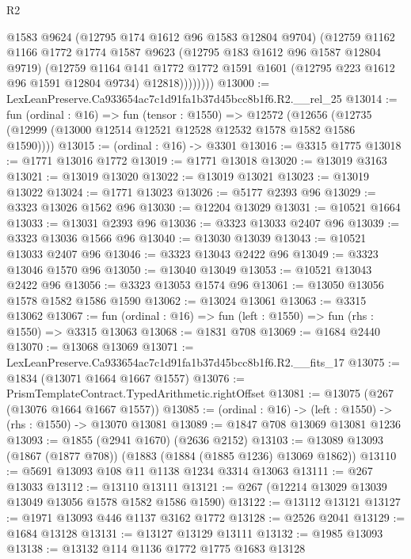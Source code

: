 \begin{lexlean}{R2}
\begin{coremodule}
                @1583
                @9624
                (@12795 @174 @1612 @96 @1583 @12804 @9704)
                (@12759
                  @1162
                  @1166
                  @1772
                  @1774
                  @1587
                  @9623
                  (@12795 @183 @1612 @96 @1587 @12804 @9719)
                  (@12759
                    @1164
                    @141
                    @1772
                    @1772
                    @1591
                    @1601
                    (@12795 @223 @1612 @96 @1591 @12804 @9734)
                    @12818))))))))
@13000 := LexLeanPreserve.Ca933654ac7c1d91fa1b37d45bcc8b1f6.R2.__rel_25
@13014 := fun (ordinal : @16) =>
  fun (tensor : @1550) =>
  @12572 (@12656 (@12735 (@12999 (@13000 @12514 @12521 @12528 @12532 @1578 @1582 @1586 @1590))))
@13015 := (ordinal : @16) -> @3301
@13016 := @3315 @1775
@13018 := @1771 @13016 @1772
@13019 := @1771 @13018
@13020 := @13019 @3163
@13021 := @13019 @13020
@13022 := @13019 @13021
@13023 := @13019 @13022
@13024 := @1771 @13023
@13026 := @5177 @2393 @96
@13029 := @3323 @13026 @1562 @96
@13030 := @12204 @13029
@13031 := @10521 @1664
@13033 := @13031 @2393 @96
@13036 := @3323 @13033 @2407 @96
@13039 := @3323 @13036 @1566 @96
@13040 := @13030 @13039
@13043 := @10521 @13033 @2407 @96
@13046 := @3323 @13043 @2422 @96
@13049 := @3323 @13046 @1570 @96
@13050 := @13040 @13049
@13053 := @10521 @13043 @2422 @96
@13056 := @3323 @13053 @1574 @96
@13061 := @13050 @13056 @1578 @1582 @1586 @1590
@13062 := @13024 @13061
@13063 := @3315 @13062
@13067 := fun (ordinal : @16) => fun (left : @1550) => fun (rhs : @1550) => @3315 @13063
@13068 := @1831 @708
@13069 := @1684 @2440
@13070 := @13068 @13069
@13071 := LexLeanPreserve.Ca933654ac7c1d91fa1b37d45bcc8b1f6.R2.__fits_17
@13075 := @1834 (@13071 @1664 @1667 @1557)
@13076 := PrismTemplateContract.TypedArithmetic.rightOffset
@13081 := @13075 (@267 (@13076 @1664 @1667 @1557))
@13085 := (ordinal : @16) -> (left : @1550) -> (rhs : @1550) -> @13070 @13081
@13089 := @1847 @708 @13069 @13081 @1236
@13093 := @1855 (@2941 @1670) (@2636 @2152)
@13103 := @13089 @13093 (@1867 (@1877 @708)) (@1883 (@1884 (@1885 @1236) @13069 @1862))
@13110 := @5691 @13093 @108 @11 @1138 @1234 @3314 @13063
@13111 := @267 @13033
@13112 := @13110 @13111
@13121 := @267 (@12214 @13029 @13039 @13049 @13056 @1578 @1582 @1586 @1590)
@13122 := @13112 @13121
@13127 := @1971 @13093 @446 @1137 @3162 @1772
@13128 := @2526 @2041
@13129 := @1684 @13128
@13131 := @13127 @13129 @13111
@13132 := @1985 @13093
@13138 := @13132 @114 @1136 @1772 @1775 @1683 @13128

\end{coremodule}
\end{lexlean}
